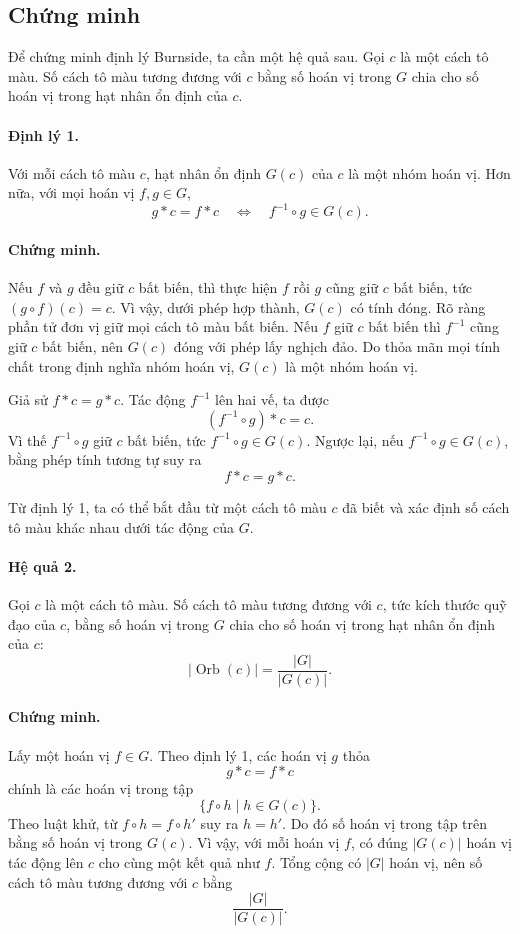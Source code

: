 \documentclass[11pt]{article}
\begin{document}
\subsection{Chứng minh}

Để chứng minh định lý Burnside, ta cần một hệ quả sau. Gọi \(c\) là một cách
tô màu. Số cách tô màu tương đương với \(c\) bằng số hoán vị trong \(G\) chia
cho số hoán vị trong hạt nhân ổn định của \(c\).

\paragraph{Định lý 1.}
Với mỗi cách tô màu \(c\), hạt nhân ổn định \(G(c)\) của \(c\) là một nhóm
hoán vị. Hơn nữa, với mọi hoán vị \(f,g\in G\),
\[
  g*c=f*c
  \quad\Longleftrightarrow\quad
  f^{-1}\circ g\in G(c).
\]

\paragraph{Chứng minh.}
Nếu \(f\) và \(g\) đều giữ \(c\) bất biến, thì thực hiện \(f\) rồi \(g\) cũng
giữ \(c\) bất biến, tức \((g\circ f)(c)=c\). Vì vậy, dưới phép hợp thành,
\(G(c)\) có tính đóng. Rõ ràng phần tử đơn vị giữ mọi cách tô màu bất biến.
Nếu \(f\) giữ \(c\) bất biến thì \(f^{-1}\) cũng giữ \(c\) bất biến, nên
\(G(c)\) đóng với phép lấy nghịch đảo. Do thỏa mãn mọi tính chất trong định
nghĩa nhóm hoán vị, \(G(c)\) là một nhóm hoán vị.

Giả sử \(f*c=g*c\). Tác động \(f^{-1}\) lên hai vế, ta được
\[
  (f^{-1}\circ g)*c=c.
\]
Vì thế \(f^{-1}\circ g\) giữ \(c\) bất biến, tức \(f^{-1}\circ g\in G(c)\).
Ngược lại, nếu \(f^{-1}\circ g\in G(c)\), bằng phép tính tương tự suy ra
\[
  f*c=g*c.
\]

Từ định lý 1, ta có thể bắt đầu từ một cách tô màu \(c\) đã biết và xác định
số cách tô màu khác nhau dưới tác động của \(G\).

\paragraph{Hệ quả 2.}
Gọi \(c\) là một cách tô màu. Số cách tô màu tương đương với \(c\), tức kích
thước quỹ đạo của \(c\), bằng số hoán vị trong \(G\) chia cho số hoán vị trong
hạt nhân ổn định của \(c\):
\[
  |\operatorname{Orb}(c)|=\frac{|G|}{|G(c)|}.
\]

\paragraph{Chứng minh.}
Lấy một hoán vị \(f\in G\). Theo định lý 1, các hoán vị \(g\) thỏa
\[
  g*c=f*c
\]
chính là các hoán vị trong tập
\[
  \{f\circ h\mid h\in G(c)\}.
\]
Theo luật khử, từ \(f\circ h=f\circ h'\) suy ra \(h=h'\). Do đó số hoán vị
trong tập trên bằng số hoán vị trong \(G(c)\). Vì vậy, với mỗi hoán vị \(f\),
có đúng \(|G(c)|\) hoán vị tác động lên \(c\) cho cùng một kết quả như \(f\).
Tổng cộng có \(|G|\) hoán vị, nên số cách tô màu tương đương với \(c\) bằng
\[
  \frac{|G|}{|G(c)|}.
\]
\end{document}
